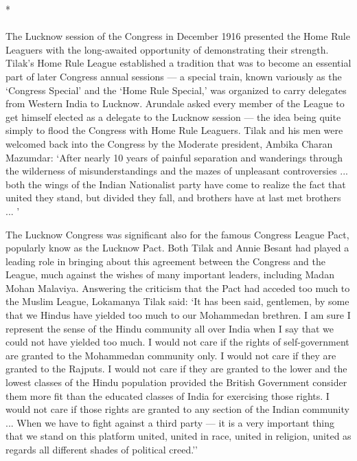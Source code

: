 \begin{center}*\end{center}

\paragraph*{}

The Lucknow session of the Congress in December 1916 presented the Home Rule Leaguers with the long-awaited opportunity of demonstrating their strength. Tilak's Home Rule League established a tradition that was to become an essential part of later Congress annual sessions --- a special train, known variously as the `Congress Special' and the `Home Rule Special,' was organized to carry delegates from Western India to Lucknow. Arundale asked every member of the League to get himself elected as a delegate to the Lucknow session --- the idea being quite simply to flood the Congress with Home Rule Leaguers. Tilak and his men were welcomed back into the Congress by the Moderate president, Ambika Charan Mazumdar: `After nearly 10 years of painful separation and wanderings through the wilderness of misunderstandings and the mazes of unpleasant controversies ... both the wings of the Indian Nationalist party have come to realize the fact that united they stand, but divided they fall, and brothers have at last met brothers ... '

The Lucknow Congress was significant also for the famous Congress League Pact, popularly know as the Lucknow Pact. Both Tilak and Annie Besant had played a leading role in bringing about this agreement between the Congress and the League, much against the wishes of many important leaders, including Madan Mohan Malaviya. Answering the criticism that the Pact had acceded too much to the Muslim League, Lokamanya Tilak said: `It has been said, gentlemen, by some that we Hindus have yielded too much to our Mohammedan brethren. I am sure I represent the sense of the Hindu community all over India when I say that we could not have yielded too much. I would not care if the rights of self-government are granted to the Mohammedan community only. I would not care if they are granted to the Rajputs. I would not care if they are granted to the lower and the lowest classes of the Hindu population provided the British Government consider them more fit than the educated classes of India for exercising those rights. I would not care if those rights are granted to any section of the Indian community ... When we have to fight against a third party --- it is a very important thing that we stand on this platform united, united in race, united in religion, united as regards all different shades of political creed.''

